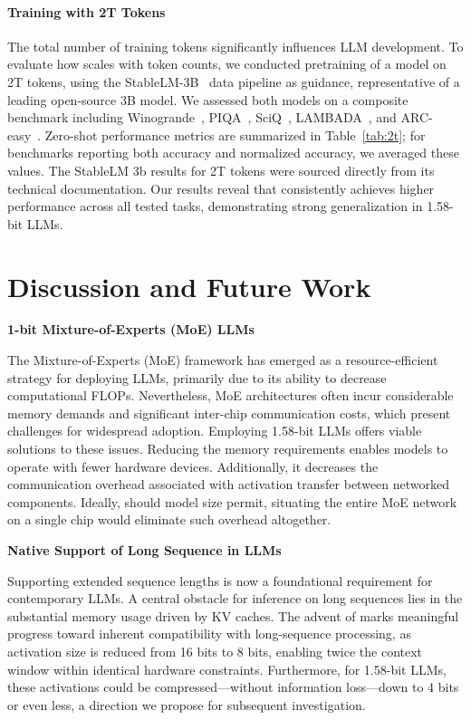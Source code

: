 \paragraph{Training with 2T Tokens}

The total number of training tokens significantly influences LLM development. To evaluate how  scales with token counts, we conducted pretraining of a  model on 2T tokens, using the StableLM-3B~\cite{StableLM-3B-4E1T} data pipeline as guidance, representative of a leading open-source 3B model. We assessed both models on a composite benchmark including Winogrande~\cite{winoGrande}, PIQA~\cite{piqa}, SciQ~\cite{sciq}, LAMBADA~\cite{lambada}, and ARC-easy~\cite{arc}. Zero-shot performance metrics are summarized in Table~\ref{tab:2t}; for benchmarks reporting both accuracy and normalized accuracy, we averaged these values. The StableLM 3b results for 2T tokens were sourced directly from its technical documentation. Our results reveal that  consistently achieves higher performance across all tested tasks, demonstrating strong generalization in 1.58-bit LLMs.

\section{Discussion and Future Work}

\textbf{1-bit Mixture-of-Experts (MoE) LLMs}

The Mixture-of-Experts (MoE) framework has emerged as a resource-efficient strategy for deploying LLMs, primarily due to its ability to decrease computational FLOPs. Nevertheless, MoE architectures often incur considerable memory demands and significant inter-chip communication costs, which present challenges for widespread adoption. Employing 1.58-bit LLMs offers viable solutions to these issues. Reducing the memory requirements enables models to operate with fewer hardware devices. Additionally, it decreases the communication overhead associated with activation transfer between networked components. Ideally, should model size permit, situating the entire MoE network on a single chip would eliminate such overhead altogether.

\textbf{Native Support of Long Sequence in LLMs}

Supporting extended sequence lengths is now a foundational requirement for contemporary LLMs. A central obstacle for inference on long sequences lies in the substantial memory usage driven by KV caches. The advent of  marks meaningful progress toward inherent compatibility with long-sequence processing, as activation size is reduced from 16 bits to 8 bits, enabling twice the context window within identical hardware constraints. Furthermore, for 1.58-bit LLMs, these activations could be compressed—without information loss—down to 4 bits or even less, a direction we propose for subsequent investigation.

